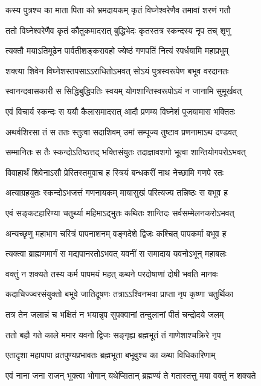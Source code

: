 \twolineshloka
{कस्य पुत्रश्च का माता पिता को भ्रमदायकम्}
{कृतं विघ्नेश्वरेणैव तमावां शरणं गतौ} %

\twolineshloka
{ततो विघ्नेश्वरेणैव कृतं कौतुकमादरात्}
{बुद्धिभेदः कृतस्तत्र स्कन्दस्य नृप तच् श‍ृणु} %

\twolineshloka
{त्यक्तौ मयाऽतिमूढेन पार्वतीशङ्करावहो}
{ज्येष्ठं गणपतिं नित्यं स्पर्धयामि महाप्रभुम्} %

\twolineshloka
{शक्त्या शिवेन विघ्नेशस्तपसाऽऽराधितोऽभवत्}
{सोऽयं पुत्रस्वरूपेण बभूव वरदानतः} %

\twolineshloka
{स्वानन्दवासकारी स सिद्धिबुद्धिपतिः स्वयम्}
{योगशान्तिस्वरूपोऽयं न जानामि सुमूर्खवत्} %

\twolineshloka
{एवं विचार्य स्कन्दः स ययौ कैलासमादरात्}
{आदौ प्रणम्य विघ्नेशं पूजयामास भक्तितः} %

\twolineshloka
{अथर्वशिरसा तं स ततः स्तुत्वा सदाशिवम्}
{उमां सम्पूज्य तुष्टाव प्रणनामाऽथ दण्डवत्} %

\twolineshloka
{सम्मानितः स तैः स्कन्दोऽतिष्ठत्तद् भक्तिसंयुतः}
{तदाज्ञावशगो भूत्वा शान्तियोगपरोऽभवत्} %

\twolineshloka
{विवाहार्थं शिवेनाऽसौ प्रेरितस्तमुवाच ह}
{स्त्रियं बन्धकरीं नाथ नेच्छामि गणपे रतः} %

\twolineshloka
{अत्याग्रहयुतः स्कन्दोऽभजत्तं गणनायकम्}
{मायासुखं परित्यज्य तन्निष्ठः स बभूव ह} %

\twolineshloka
{एवं सङ्कटहारिण्या चतुर्थ्या महिमाऽद्भुतः}
{कथितः शान्तिदः सर्वसम्मेलनकरोऽभवत्} %

\twolineshloka
{अन्यच्छृणु महाभाग चरित्रं पापनाशनम्}
{वङ्गदेशे द्विजः कश्चित् पापकर्मा बभूव ह} %

\twolineshloka
{त्यक्त्वा ब्राह्मणमार्गं स मद्यपानरतोऽभवत्}
{यवनीं स समादाय यवनोऽभून् महाबलः} %

\twolineshloka
{वक्तुं न शक्यते तस्य कर्म पापमयं महत्}
{कथने परदोषाणां दोषी भवति मानवः} %

\twolineshloka
{कदाचिज्ज्वरसंयुक्तो बभूवे जातिदूषणः}
{तत्राऽऽश्विनभवा प्राप्ता नृप कृष्णा चतुर्थिका} %

\twolineshloka
{तत्र तेन जलान्नं च भक्षितं न भयान्नृप}
{सुपक्वानां तन्दुलानां पीतं चन्द्रोदये जलम्} %

\twolineshloka
{ततो बहौ गते काले ममार यवनो द्विजः}
{सङ्गृह्य ब्रह्मभूतं तं गाणेशाश्चक्रिरे नृप} %

\twolineshloka
{एतादृशा महापापा व्रतपुण्यप्रभावतः}
{ब्रह्मभूता बभूवुश्च का कथा विधिकारिणाम्} %

\twolineshloka
{एवं नाना जना राजन् भुक्त्वा भोगान् यथेप्सितान्}
{ब्रह्मण्यं ते गतास्तत्तु मया वक्तुं न शक्यते} %


